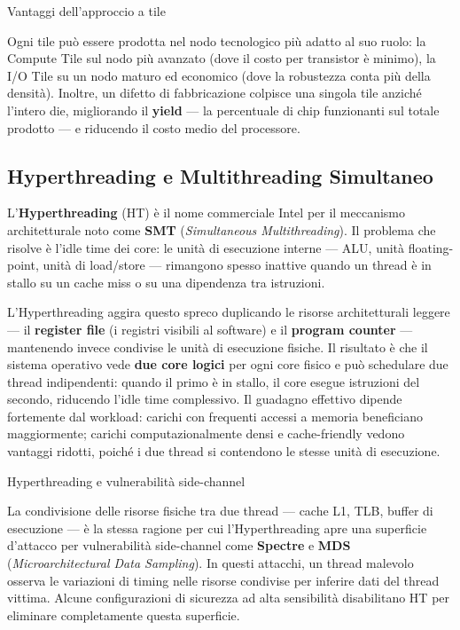 \documentclass[
  italian,
  openany]{book}
\begin{document}
\begin{callouttip}{Vantaggi dell’approccio a tile}

Ogni tile può essere prodotta nel nodo tecnologico più adatto al suo
ruolo: la Compute Tile sul nodo più avanzato (dove il costo per
transistor è minimo), la I/O Tile su un nodo maturo ed economico (dove
la robustezza conta più della densità). Inoltre, un difetto di
fabbricazione colpisce una singola tile anziché l'intero die,
migliorando il \textbf{yield} --- la percentuale di chip funzionanti sul
totale prodotto --- e riducendo il costo medio del processore.

\end{callouttip}

\subsection{Hyperthreading e Multithreading
Simultaneo}\label{hyperthreading-e-multithreading-simultaneo}

L'\textbf{Hyperthreading} (HT) è il nome commerciale Intel per il
meccanismo architetturale noto come \textbf{SMT} (\emph{Simultaneous
Multithreading}). Il problema che risolve è l'idle time dei core: le
unità di esecuzione interne --- ALU, unità floating-point, unità di
load/store --- rimangono spesso inattive quando un thread è in stallo su
un cache miss o su una dipendenza tra istruzioni.

L'Hyperthreading aggira questo spreco duplicando le risorse
architetturali leggere --- il \textbf{register file} (i registri
visibili al software) e il \textbf{program counter} --- mantenendo
invece condivise le unità di esecuzione fisiche. Il risultato è che il
sistema operativo vede \textbf{due core logici} per ogni core fisico e
può schedulare due thread indipendenti: quando il primo è in stallo, il
core esegue istruzioni del secondo, riducendo l'idle time complessivo.
Il guadagno effettivo dipende fortemente dal workload: carichi con
frequenti accessi a memoria beneficiano maggiormente; carichi
computazionalmente densi e cache-friendly vedono vantaggi ridotti,
poiché i due thread si contendono le stesse unità di esecuzione.

\begin{calloutwarning}{Hyperthreading e vulnerabilità side-channel}

La condivisione delle risorse fisiche tra due thread --- cache L1, TLB,
buffer di esecuzione --- è la stessa ragione per cui l'Hyperthreading
apre una superficie d'attacco per vulnerabilità side-channel come
\textbf{Spectre} e \textbf{MDS} (\emph{Microarchitectural Data
Sampling}). In questi attacchi, un thread malevolo osserva le variazioni
di timing nelle risorse condivise per inferire dati del thread vittima.
Alcune configurazioni di sicurezza ad alta sensibilità disabilitano HT
per eliminare completamente questa superficie.

\end{calloutwarning}
\end{document}
